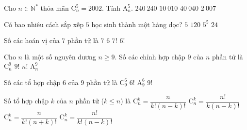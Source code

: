 

\begin{ex}%
	Cho $n\in{\mathbb{N}^{*}}$ thỏa mãn $\mathrm{C}_n^5=2002$. Tính $\mathrm{A}_n^5$. 
	 \choice
		{\True $240\  240$}
		{$10\ 010$} 
		{$40\ 040$} 
		 {$2\ 007$}
\end{ex}

\begin{ex}%
	 Có bao nhiêu cách sắp xếp $5$ học sinh thành một hàng dọc?
	\choice 
		 {$5$}
		 {\True $120$}
		{$5^5$} 
		 {$24$}
\end{ex}

\begin{ex}%
	Số các  hoán vị của $7$ phần tử là
	 \choice
		{$7$} 
		 {$6$}
		{\True  $7!$}
		{$6!$} 
\end{ex}

\begin{ex}%
	Cho $n$ là một số nguyên dương $n \geq 9$. Số các chỉnh hợp  chập $9$ của $n$ phần tử là
	\choice 
		{$\mathrm{C}_n^9$} 
		{$9!$} 
		{$n!$} 
		{\True  $\mathrm{A}_n^9$}
\end{ex}

\begin{ex}%
	Số các tổ hợp chập $6$ của  $9$ phần tử là
	 \choice
		 {$\mathrm{C}_9^6$}
		 {$6!$}
		 {\True $\mathrm{A}_9^6$}
		{$9!$} 
\end{ex}

\begin{ex}%
	Số tổ hợp chập $k$ của $n$ phần tử ($k\le n$)  là
	 \choice
		 {$\mathrm{C}_n^k=\dfrac{n}{k!\left( n-k \right)!}$}
		{$\mathrm{C}_n^k=\dfrac{n!}{k\left(  n-k \right)!}$}
		{$\mathrm{C}_n^k=\dfrac{n}{k!\left(  n+k \right)!}$}
		{\True $\mathrm{C}_n^k=\dfrac{n!}{k!\left( n-k \right)!}$} 
\end{ex}

